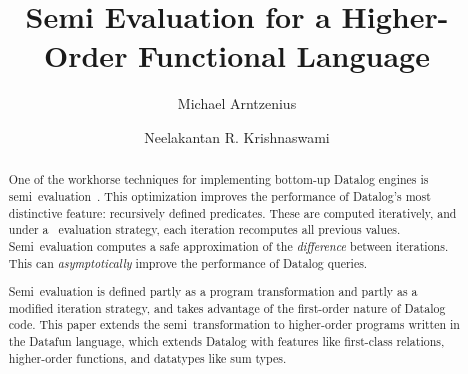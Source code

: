 \documentclass[acmsmall,]{acmart}\settopmatter{printfolios=true,printccs=false,printacmref=false}
\begin{document}
\title{Semi\naive{} Evaluation for a Higher-Order Functional Language}


\author{Michael Arntzenius}

\author{Neelakantan R. Krishnaswami}


\begin{abstract}
One of the workhorse techniques for implementing bottom-up Datalog engines is
semi\naive\ evaluation~\cite{seminaive}. This optimization improves the
performance of Datalog's most distinctive feature: recursively defined
predicates. These are computed iteratively, and under a \naive\ evaluation
strategy, each iteration recomputes all previous values. Semi\naive\ evaluation
computes a safe approximation of the \emph{difference} between iterations. This
can \emph{asymptotically} improve the performance of Datalog queries.

Semi\naive\ evaluation is defined partly as a program transformation and partly
as a modified iteration strategy, and takes advantage of the first-order nature
of Datalog code.
%
This paper extends the semi\naive\ transformation to higher-order programs
written in the Datafun language, which extends Datalog with features like
first-class relations, higher-order functions, and datatypes like sum types.
\end{abstract}
\end{document}

